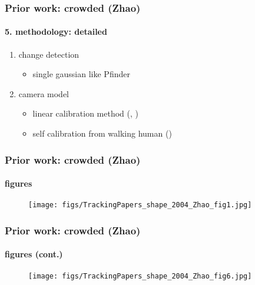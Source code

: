 \begin{frame}
\frametitle{Prior work: crowded (Zhao)}
\framesubtitle{5. methodology: detailed}
\logoCSIPCPL\mypagenum
{}
	\begin{enumerate}\setcounter{enumi}{0}
		\item change detection
			\begin{itemize}
				\item single gaussian like Pfinder
			\end{itemize}
		\item camera model
			\begin{itemize}
				\item linear calibration method (, )
				\item self calibration from walking human ()
			\end{itemize}
	\end{enumerate}
\end{frame}




\begin{frame}
\frametitle{Prior work: crowded (Zhao)}
\framesubtitle{figures}
\mypagenum
{}
	\begin{figure}
		\texttt{[image: figs/TrackingPapers\_shape\_2004\_Zhao\_fig1.jpg]}
		\label{fig:1}
	\end{figure}
\end{frame}



\begin{frame}
\frametitle{Prior work: crowded (Zhao)}
\framesubtitle{figures (cont.)}
\mypagenum
{}
	\begin{figure}
		\texttt{[image: figs/TrackingPapers\_shape\_2004\_Zhao\_fig6.jpg]}
	\end{figure}
\end{frame}